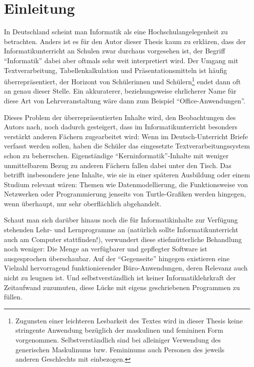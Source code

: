 \section{Einleitung}
\label{sec:introduction}

In Deutschland scheint man Informatik als eine Hochschulangelegenheit zu betrachten. Anders ist es für den Autor dieser Thesis kaum zu erklären, dass der Informatikunterricht an Schulen zwar durchaus vorgesehen ist, der Begriff "`Informatik"' dabei aber oftmals sehr weit interpretiert wird. Der Umgang mit Textverarbeitung, Tabellenkalkulation und Präsentationsmitteln ist häufig überrepräsentiert, der Horizont von Schülerinnen und Schülern\footnote{Zugunsten einer leichteren Lesbarkeit des Textes wird in dieser Thesis keine stringente Anwendung bezüglich der maskulinen und femininen Form vorgenommen. Selbstverständlich sind bei alleiniger Verwendung des generischen Maskulinums bzw. Femininums auch Personen des jeweils anderen Geschlechts mit einbezogen.} endet dann oft an genau dieser Stelle. Ein akkuraterer, beziehungsweise ehrlicherer Name für diese Art von Lehrveranstaltung wäre dann zum Beispiel "`Office-Anwendungen"'.

Dieses Problem der überrepräsentierten Inhalte wird, den Beobachtungen des Autors nach, noch dadurch gesteigert, dass im Informatikunterricht besonders verstärkt anderen Fächern zugearbeitet wird: Wenn im Deutsch-Unterricht Briefe verfasst werden sollen, haben die Schüler das eingesetzte Textverarbeitungssystem schon zu beherrschen. Eigenständige "`Kerninformatik"'-Inhalte mit weniger unmittelbarem Bezug zu anderen Fächern fallen dabei unter den Tisch. Das betrifft insbesondere jene Inhalte, wie sie in einer späteren Ausbildung oder einem Studium relevant wären: Themen wie Datenmodellierung, die Funktionsweise von Netzwerken oder Programmierung jenseits von Turtle-Grafiken werden hingegen, wenn überhaupt, nur sehr oberflächlich abgehandelt.

Schaut man sich darüber hinaus noch die für Informatikinhalte zur Verfügung stehenden Lehr- und Lernprogramme an (natürlich sollte Informatikunterricht auch am Computer stattfinden!), verwundert diese stiefmütterliche Behandlung noch weniger: Die Menge an verfügbarer und gepflegter Software ist ausgesprochen überschaubar. Auf der "`Gegenseite"' hingegen existieren eine Vielzahl hervorragend funktionierender Büro-Anwendungen, deren Relevanz auch nicht zu leugnen ist. Und selbstverständlich ist keiner Informatiklehrkraft der Zeitaufwand zuzumuten, diese Lücke mit eigens geschriebenen Programmen zu füllen.

